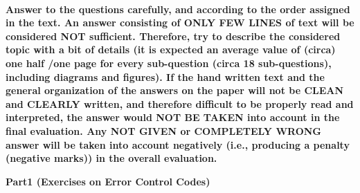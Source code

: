 \documentclass[11pt]{article}
\begin{document}


\\

\noindent \large {\bf{Answer to the questions carefully, and according to the order assigned in the text. An answer consisting of ONLY FEW LINES of text will be considered NOT sufficient. Therefore, try to describe the considered topic with a bit of details (it is expected an average value of (circa) one half /one page for every sub-question (circa 18 sub-questions), including diagrams and figures). If the hand written text and the general organization of the answers on the paper will not be CLEAN and CLEARLY written, and therefore difficult to be properly read and interpreted, the answer would NOT BE TAKEN into account in the final evaluation. Any NOT GIVEN or COMPLETELY WRONG answer will be taken into account negatively (i.e., producing a penalty (negative marks)) in the overall evaluation.}}\\

\parindent0pt
\parskip 1mm

{\bf Part1 (Exercises on Error Control Codes)} 
\end{document}
